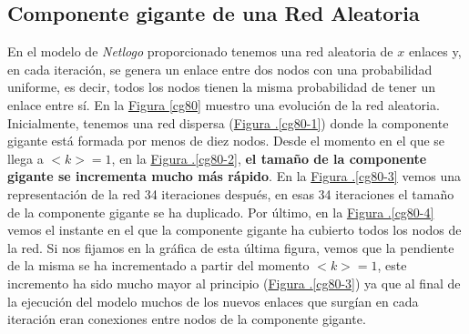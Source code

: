 \documentclass[10pt,a4paper,spanish]{article}
\numberwithin{equation}{section} %
\numberwithin{figure}{section} %
\numberwithin{table}{section} %
\theoremstyle{plain}
\theoremstyle{definition}
\begin{document}
\subsection{Componente gigante de una Red Aleatoria}
En el modelo de \textit{Netlogo} proporcionado tenemos una red aleatoria de $x$ enlaces y, en cada iteración, se genera un enlace entre dos nodos con una probabilidad uniforme, es decir, todos los nodos tienen la misma probabilidad de tener un enlace entre sí. En la \hyperref[cg80]{Figura \ref*{cg80}} muestro una evolución de la red aleatoria. Inicialmente, tenemos una red dispersa (\hyperref[cg80-1]{Figura \thesection .\ref*{cg80-1}}) donde la componente gigante está formada por menos de diez nodos. Desde el momento en el que se llega a $<k>=1$, en la \hyperref[cg80-2]{Figura \thesection .\ref*{cg80-2}}, \textbf{el tamaño de la componente gigante se incrementa mucho más rápido}. En la \hyperref[cg80-3]{Figura \thesection .\ref*{cg80-3}} vemos una representación de la red 34 iteraciones después, en esas 34 iteraciones el tamaño de la componente gigante se ha duplicado. Por último, en la \hyperref[cg80-4]{Figura \thesection .\ref*{cg80-4}} vemos el instante en el que la componente gigante ha cubierto todos los nodos de la red. Si nos fijamos en la gráfica de esta última figura, vemos que la pendiente de la misma se ha incrementado a partir del momento $<k>=1$, este incremento ha sido mucho mayor al principio (\hyperref[cg80-3]{Figura \thesection .\ref*{cg80-3}}) ya que al final de la ejecución del modelo muchos de los nuevos enlaces que surgían en cada iteración eran conexiones entre nodos de la componente gigante.
\end{document}

